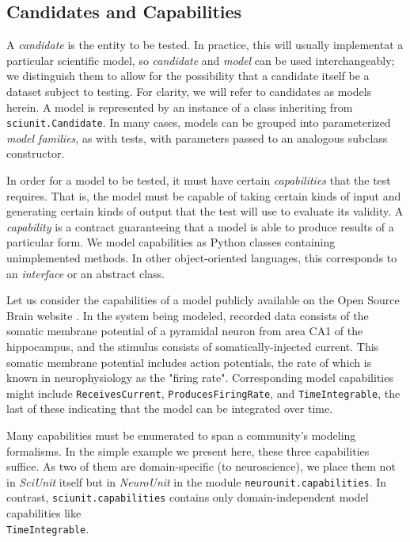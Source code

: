 \documentclass[11pt,letterpaper]{article}
\begin{document}
\subsection{Candidates and Capabilities}
A \textit{candidate} is the entity to be tested.  In practice, this will usually implementat a particular scientific model, so \textit{candidate} and \textit{model} can be used interchangeably; we distinguish them to allow for the possibility that a candidate itself be a dataset subject to testing.  For clarity, we will refer to candidates as models herein.  A model is represented by an instance of a class inheriting from \verb|sciunit.Candidate|.  In many cases, models can be grouped into parameterized \textit{model families}, as with tests, with parameters passed to an analogous subclass constructor.

In order for a model to be tested, it must have certain \textit{capabilities} that the test requires.  That is, the model must be capable of taking certain kinds of input and generating certain kinds of output that the test will use to evaluate its validity.  A \textit{capability} is a contract guaranteeing that a model is able to produce results of a particular form. We model capabilities as Python classes containing unimplemented methods. In other object-oriented languages, this corresponds to an \textit{interface} or an abstract class.  

Let us consider the capabilities of a model publicly available on the Open Source Brain website \cite{osb_ca1_url}.  In the system being modeled, recorded data consists of the somatic membrane potential of a pyramidal neuron from area CA1 of the hippocampus, and the stimulus consists of somatically-injected current.  This somatic membrane potential includes action potentials, the rate of which is known in neurophysiology as the "firing rate".  Corresponding model capabilities might include \verb|ReceivesCurrent|, \verb|ProducesFiringRate|, and \verb|TimeIntegrable|, the last of these indicating that the model can be integrated over time.    

Many capabilities must be enumerated to span a community's modeling formalisms. In the simple example we present here, these three capabilities suffice.  As two of them are domain-specific (to neuroscience), we place them not in \textit{SciUnit} itself but in \textit{NeuroUnit} in the module \verb|neurounit.capabilities|.  In contrast, \verb|sciunit.capabilities| contains only domain-independent model capabilities like\\ \verb|TimeIntegrable|.
\end{document}
